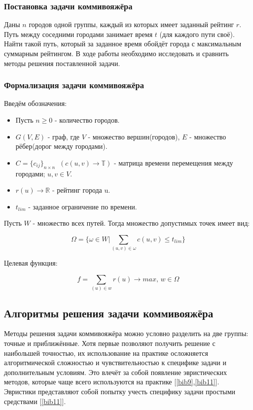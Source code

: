 \subsubsection{Постановка задачи коммивояжёра}
Даны $n$ городов одной группы, каждый из которых имеет заданный рейтинг $r$. Путь между соседними городами занимает время $t$ (для каждого пути своё). Найти такой путь, который за заданное время обойдёт города с максимальным суммарным рейтингом. В ходе работы необходимо исследовать и сравнить методы решения поставленной задачи.


\subsubsection{Формализация задачи коммивояжёра}
Введём обозначения:

\begin{itemize}
    \item[] Пусть $n\geq{0}$ - количество городов.
    \item[] $G(V,E)$ - граф, где $V$ - множество вершин(городов), $E$ - множество рёбер(дорог между городами).
    \item[] $C = \{c_{ij}\}_{n \times n}\;\; (c(u, v)\rightarrow\mathbb{T})$ - матрица времени перемещения между городами; $u, v \in V$.
    \item[] $r(u)\rightarrow \mathbb{R}$ - рейтинг города u.
    \item[] $t_{lim}$ - заданное ограничение по времени.
\end{itemize}

Пусть $W$ - множество всех путей. Тогда множество допустимых точек имеет вид:

$$\Omega = \{\omega \in W | \sum_{(u,v)\in \omega}c(u, v)\leq{t_{lim}}\}$$

Целевая функция:

$$f = \sum_{(u) \in w}r(u) \rightarrow max,\, w \in \Omega$$

\subsection{Алгоритмы решения задачи коммивояжёра}
Методы решения задачи коммивояжёра можно условно разделить на две группы: точные и приближённые. Хотя первые позволяют получить решение с наибольшей точностью, их использование на практике осложняется алгоритмической сложностью и чувствительностью к специфике задачи и дополнительным условиям. Это влечёт за собой появление эвристических методов, которые чаще всего используются на практике [\ref{bib9},\ref{bib11}]. Эвристики представляют собой попытку учесть специфику задачи простыми средствами [\ref{bib11}].\\

